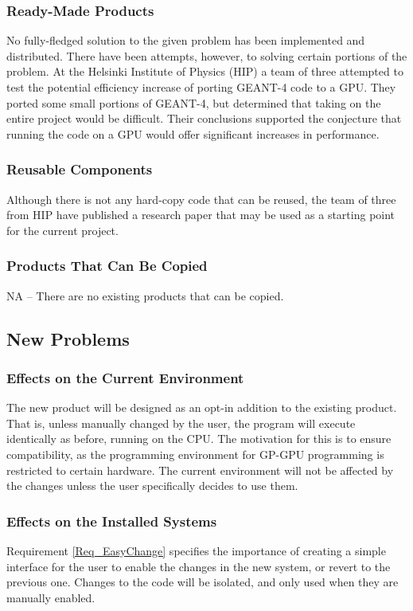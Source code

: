 \documentclass[12pt]{article}
\newcommand{\todo}[1]{\textcolor{red}{[TODO: #1]}} \else
\newcommand{\authornote}[3]{} \newcommand{\todo}[1]{} \fi
\newcommand{\ds}[1]{\authornote{blue}{DS}{#1}} %
\begin{document}
\subsubsection{Ready-Made Products}
No fully-fledged solution to the given problem has been implemented and distributed. There have been attempts, however, to solving certain portions of the problem. At the Helsinki Institute of Physics (HIP) a team of three attempted to test the potential efficiency increase of porting GEANT-4 code to a GPU. They ported some small portions of GEANT-4, but determined that taking on the entire project would be difficult. Their conclusions supported the conjecture that running the code on a GPU would offer significant increases in performance.

\subsubsection{Reusable Components}
Although there is not any hard-copy code that can be reused, the team of three from HIP have published a research paper that may be used as a starting point for the current project.

\subsubsection{Products That Can Be Copied}
NA -- There are no existing products that can be copied.

\subsection{New Problems}\label{SubSec_NewProbs} %
\subsubsection{Effects on the Current Environment}
The new product will be designed as an opt-in addition to the existing product. That is, unless manually changed by the user, the program will execute identically as before, running on the CPU. The motivation for this is to ensure compatibility, as the programming environment for GP-GPU programming is restricted to certain hardware. The current environment will not be affected by the changes unless the user specifically decides to use them.
\ds{You are describing design decisions, not effects on the current environment}

\subsubsection{Effects on the Installed Systems}
Requirement \ref{Req_EasyChange} specifies the importance of creating a simple interface for the user to enable the changes in the new system, or revert to the previous one. Changes to the code will be isolated, and only used when they are manually enabled.
\ds{Again you are talking about design. Here you should be detailing what your
how your product interfaces with the existing system. Are there any potential
conflicts that would need to be solved (i.e. by your design decision)?}
\end{document}
